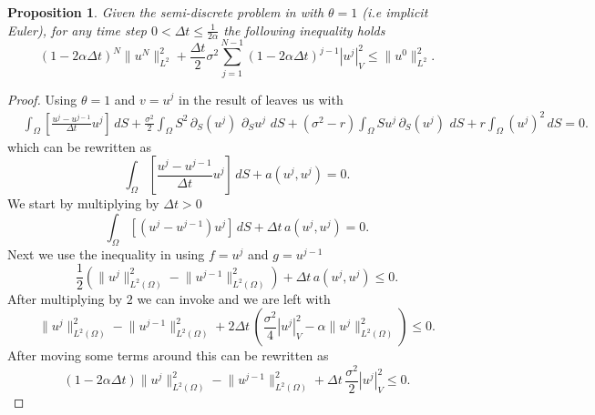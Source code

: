 \documentclass{article}
\newtheorem{prop}[thm]{Proposition}
\newcommand{\argwrapsquare}[1]{\left[#1\right]}
\newcommand{\intS}[1]{\ensuremath{\int_{\Omega}#1 \, dS}}
\newcommand{\intSlong}[1]{\intS{\argwrapsquare{#1}}}
\newcommand{\darg}[2]{\ensuremath{\, \partial_{#2}#1} \, }
\newcommand{\dS}[1]{\ensuremath{\darg{#1}{S}}}
\newcommand{\sigmafrac}{\ensuremath{\frac{\sigma^2}{2}}}
\newcommand{\seminormsq}[1]{\ensuremath{|#1|_V^2}}
\newcommand{\normsq}[1]{\ensuremath{\|#1\|_{L^2(\Omega)}^2}}
\begin{document}
\begin{prop}
    Given the semi-discrete problem in  with $\theta = 1$ (i.e implicit Euler), for any time step $0 < \Delta t \leq \frac{1}{2 \alpha}$ the following inequality holds\\
    \begin{equation*}
        (1 - 2\alpha \Delta t)^N \| u^N \|_{L^2}^2 + \frac{\Delta t}{2} \sigma^2 \sum_{j=1}^{N-1} (1 - 2\alpha \Delta t)^{j-1} \seminormsq{u^j} \leq \| u^0 \|_{L^2}^2.
        \label{eq:placeholder_label}
    \end{equation*}
\end{prop}
\begin{proof}
    Using $\theta = 1$ and $v = u^j$ in the result of  leaves us with
    \begin{align*}
        &\intSlong{\frac{u^{j} - u^{j-1}}{\Delta t}  u^{j}} +\sigmafrac \intS{S^2 \dS{\left(u^{j}\right)} \dS{u^{j}}} + (\sigma^2 - r) \intS{S u^{j} \dS{\left(u^{j}\right)}} + r \intS{(u^{j})^2} =0.
        \end{align*}
    which can be rewritten as
    \begin{equation}\label{eq:discret_time_and_a_u_j+1}
        \intSlong{\frac{u^{j} - u^{j-1}}{\Delta t}  u^{j}} + a(u^{j},u^{j}) = 0.
    \end{equation}
   We start by multiplying  by $\Delta t > 0$
   \begin{equation*}
    \intSlong{(u^{j} - u^{j-1})  u^{j}} + \Delta t \,a(u^{j},u^{j}) = 0.
    \end{equation*}
    Next we use the inequality in  using $f = u^{j}$ and $g =u^{j-1}$
    \begin{equation*}
        \frac{1}{2}\left( \normsq{u^{j}} - \normsq{u^{j-1}} \right) + \Delta t \,a(u^{j},u^{j}) \leq 0.
    \end{equation*}
    After multiplying by $2$ we can invoke  and we are left with
    \begin{equation*}
         \normsq{u^{j}} - \normsq{u^{j-1}} + 2\Delta t \, \left( \frac{\sigma^2}{4} \seminormsq{u^{j}} - \alpha \normsq{u^{j}} \right) \leq 0.
    \end{equation*}
    After moving some terms around this can be rewritten as
    \begin{equation*}
        (1- 2\alpha \Delta t)\normsq{u^{j}}  - \normsq{u^{j-1}} + \Delta t \, \sigmafrac \seminormsq{u^{j}} \leq 0.
    \end{equation*}

\end{proof}
\end{document}
